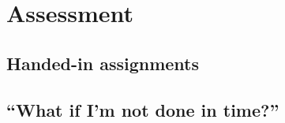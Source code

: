 \section{Assessment}%
\label{Assessment}


\subsection{Handed-in assignments}


\subsection{\enquote{What if I'm not done in time?}}%
\label{sec:late}



\printbibliography{}
